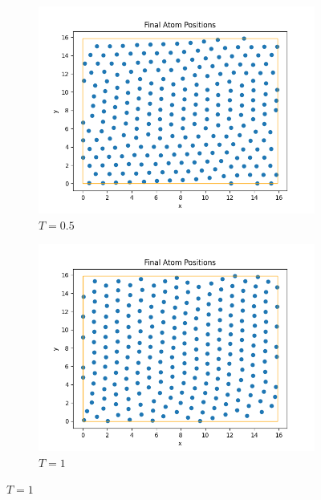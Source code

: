 \documentclass{article}
\begin{document}
\begin{figure}[H]
    \centering
    \begin{subfigure}{0.495\linewidth}
        \centering
        \includegraphics[width=\textwidth]{images/Final0.5.png}
        \caption{$T=0.5$}
    \end{subfigure}
    \hfill
    \begin{subfigure}{0.495\linewidth}
        \centering
        \includegraphics[width=\textwidth]{images/Final1.png}
        \caption{$T=1$}
    \end{subfigure}
\end{figure}
\end{document}
